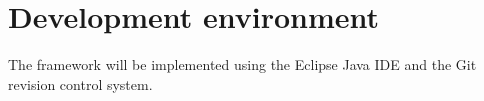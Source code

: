 \section{Development environment}

The framework will be implemented using the Eclipse Java IDE and the Git revision control system.